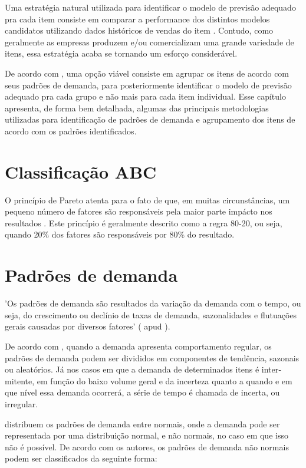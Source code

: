 \documentclass{book}
\begin{document}
Uma estratégia natural utilizada para identificar o modelo de previsão adequado pra cada item consiste em comparar a performance dos distintos modelos candidatos utilizando dados históricos de vendas do item \citep{UlrichEtAl2022}. Contudo, como geralmente as empresas produzem e/ou comercializam uma grande variedade de itens, essa estratégia acaba se tornando um esforço considerável. 

De acordo com \cite{UlrichEtAl2022}, uma opção viável consiste em agrupar os itens de acordo com seus padrões de demanda, para posteriormente identificar o modelo de previsão adequado pra cada grupo e não mais para cada item individual. Esse capítulo apresenta, de forma bem detalhada, algumas das principais metodologias utilizadas para identificação de padrões de demanda e agrupamento dos itens de acordo com os padrões identificados.

\section{Classificação ABC}

O princípio de Pareto atenta para o fato de que, em muitas circunstâncias, um pequeno número de fatores são responsáveis pela maior parte impácto nos resultados \citep{HarveySotardi2018}. Este princípio é geralmente descrito como a regra 80-20, ou seja, quando 20\% dos fatores são responsáveis por 80\% do resultado. 



\section{Padrões de demanda}

'Os padrões de demanda são resultados da variação da demanda com o tempo, ou seja, do crescimento ou declínio de taxas de demanda, sazonalidades e flutuações gerais causadas por diversos fatores' (\cite{Ballou2001} apud \cite{WernerEtAl2006}). 

De acordo com \cite{Ballou2006}, quando a demanda apresenta comportamento regular, os padrões de demanda podem ser divididos em compo­nentes de tendência, sazonais ou aleatórios. Já nos casos em que a demanda de determinados itens é inter­mitente, em função do baixo volume geral e da incerte­za quanto a quando e em que nível essa demanda ocor­rerá, a série de tempo é chamada de incerta, ou irregu­lar.

\cite{BoylanEtAl2008} distribuem os padrões de demanda entre normais, onde a demanda pode ser representada por uma distribuição normal, e não normais, no caso em que isso não é possível. De acordo com os autores, os padrões de demanda não normais podem ser classificados da seguinte forma:
\end{document}
